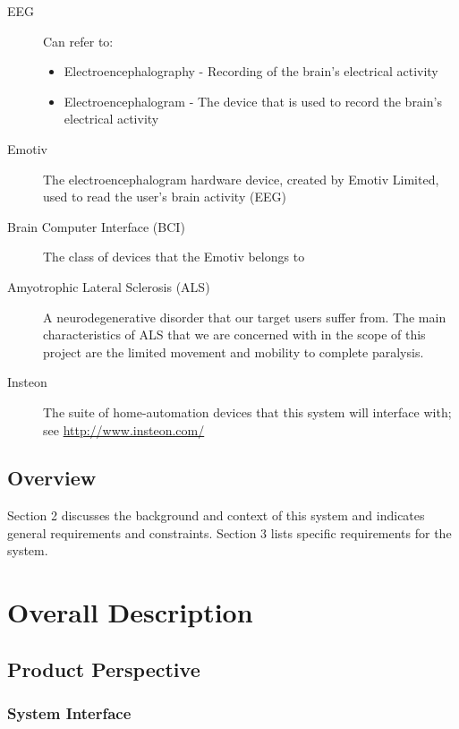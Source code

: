 \documentclass{article}
\begin{document}
\begin{description}
    \item[EEG] Can refer to:
        \begin{itemize}
            \item Electroencephalography - Recording of the brain's electrical
                activity 
	        \item Electroencephalogram - The device that is used to record the
	            brain's electrical activity
        \end{itemize}
    \item[Emotiv] The electroencephalogram hardware device, created by Emotiv
        Limited, used to read the user's brain activity (EEG)
    \item[Brain Computer Interface (BCI)] The class of devices that the Emotiv
        belongs to
    \item[Amyotrophic Lateral Sclerosis (ALS)] A neurodegenerative disorder
        that our target users suffer from. The main characteristics of ALS
        that we are concerned with in the scope of this project are the
        limited movement and mobility to complete paralysis.
    \item[Insteon] The suite of home-automation devices that this system will
        interface with; see \url{http://www.insteon.com/}
\end{description}


\subsection{Overview}

Section 2 discusses the background and context of this system and indicates
general requirements and constraints. Section 3 lists specific requirements
for the system.

\newpage

\section{Overall Description}

\subsection{Product Perspective}

\subsubsection{System Interface}
\end{document}
